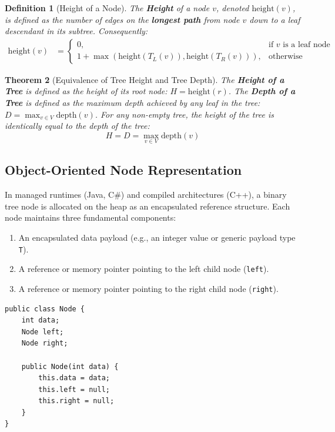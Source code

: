 \documentclass[10pt,journal,compsoc,onecolumn]{IEEEtran}
\newtheorem{theorem}{Theorem}
\newtheorem{definition}[theorem]{Definition}
\begin{document}
\begin{definition}[Height of a Node]
The \textbf{Height} of a node $v$, denoted $\mathrm{height}(v)$, is defined as the number of edges on the \textbf{longest path} from node $v$ down to a leaf descendant in its subtree. Consequently:
\begin{align}
    \mathrm{height}(v) &= \begin{cases}
        0, & \text{if } v \text{ is a leaf node} \\
        1 + \max\left(\mathrm{height}(T_L(v)), \mathrm{height}(T_R(v))\right), & \text{otherwise}
    \end{cases}
\end{align}
\end{definition}

\begin{theorem}[Equivalence of Tree Height and Tree Depth]
The \textbf{Height of a Tree} is defined as the height of its root node: $H = \mathrm{height}(r)$. The \textbf{Depth of a Tree} is defined as the maximum depth achieved by any leaf in the tree: $D = \max_{v \in V} \mathrm{depth}(v)$. For any non-empty tree, the height of the tree is identically equal to the depth of the tree:
\begin{equation}
    H = D = \max_{v \in V} \mathrm{depth}(v)
\end{equation}
\end{theorem}

\subsection{Object-Oriented Node Representation}

In managed runtimes (Java, C\#) and compiled architectures (C++), a binary tree node is allocated on the heap as an encapsulated reference structure. Each node maintains three fundamental components:
\begin{enumerate}
    \item An encapsulated data payload (e.g., an integer value or generic payload type \texttt{T}).
    \item A reference or memory pointer pointing to the left child node (\texttt{left}).
    \item A reference or memory pointer pointing to the right child node (\texttt{right}).
\end{enumerate}

\begin{verbatim}
public class Node {
    int data;
    Node left;
    Node right;

    public Node(int data) {
        this.data = data;
        this.left = null;
        this.right = null;
    }
}
\end{verbatim}
\end{document}

